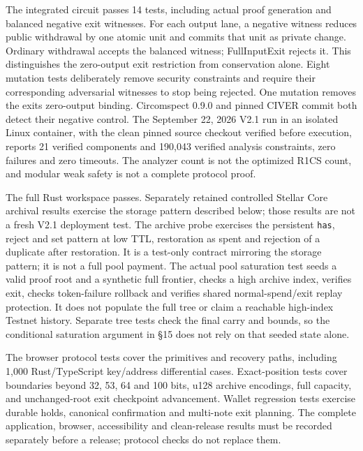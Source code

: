 \documentclass[11pt,letterpaper]{article}
\begin{document}
The integrated circuit passes 14 tests, including actual proof
generation and balanced negative exit witnesses. For each output lane, a
negative witness reduces public withdrawal by one atomic unit and
commits that unit as private change. Ordinary withdrawal accepts the
balanced witness; FullInputExit rejects it. This distinguishes the
zero-output exit restriction from conservation alone. Eight mutation
tests deliberately remove security constraints and require their
corresponding adversarial witnesses to stop being rejected. One mutation
removes the exit\textquotesingle s zero-output binding. Circomspect
0.9.0 and pinned CIVER commit
{\ttfamily{}} both
detect their negative control. The September 22, 2026 V2.1 run in an
isolated Linux container, with the clean pinned source checkout verified
before execution, reports 21 verified components and 190,043 verified
analysis constraints, zero failures and zero timeouts. The analyzer
count is not the optimized R1CS count, and modular weak safety is not a
complete protocol proof.

The full Rust workspace passes. Separately retained controlled Stellar
Core archival results exercise the storage pattern described below;
those results are not a fresh V2.1 deployment test. The archive probe
exercises the persistent \texttt{has}, reject and set pattern at low
TTL, restoration as spent and rejection of a duplicate after
restoration. It is a test-only contract mirroring the storage pattern;
it is not a full pool payment. The actual pool saturation test seeds a
valid proof root and a synthetic full frontier, checks a high archive
index, verifies exit, checks token-failure rollback and verifies shared
normal-spend/\allowbreak{}exit replay protection. It does not populate
the full tree or claim a reachable high-index Testnet history. Separate
tree tests check the final carry and bounds, so the conditional
saturation argument in \S{}15 does not rely on that seeded state alone.

The browser protocol tests cover the primitives and recovery paths,
including 1,000 Rust/\allowbreak{}TypeScript key/\allowbreak{}address
differential cases. Exact-position tests cover boundaries beyond 32, 53,
64 and 100 bits, u128 archive encodings, full capacity, and
unchanged-root exit checkpoint advancement. Wallet regression tests
exercise durable holds, canonical confirmation and multi-note exit
planning. The complete application, browser, accessibility and
clean-release results must be recorded separately before a release;
protocol checks do not replace them.
\end{document}

